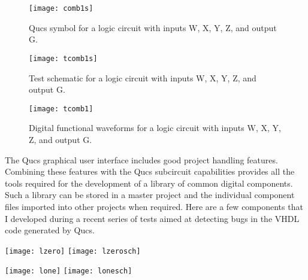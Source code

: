 \begin{figure}
  \centering
  \texttt{[image: comb1s]}
  \caption{Qucs symbol for a logic circuit with inputs W, X, Y, Z, and output G.}
  \label{fig:comb1s}
\end{figure}
\FloatBarrier

\begin{figure}
  \centering
  \texttt{[image: tcomb1s]}
  \caption{Test schematic for a logic circuit with inputs W, X, Y, Z, and output G.}
  \label{fig:tcomb1s}
\end{figure}
\FloatBarrier

\begin{figure}
  \centering
  \texttt{[image: tcomb1]}
  \caption{Digital functional waveforms for a logic circuit with inputs W, X, Y, Z, and output G.}
  \label{fig:tcomb1}
\end{figure}
\FloatBarrier


The Qucs graphical user interface includes good project handling
features.  Combining these features with the Qucs subcircuit
capabilities provides all the tools required for the development of a
library of common digital components.  Such a library can be stored in
a master project and the individual component files imported into
other projects when required.  Here are a few components that I
developed during a recent series of tests aimed at detecting bugs in
the VHDL code generated by Qucs.


\begin{flushleft}
  \texttt{[image: lzero]} \hspace{10mm} \texttt{[image: lzerosch]}

\end{flushleft}


\begin{flushleft}
  \texttt{[image: lone]} \hspace{10mm} \texttt{[image: lonesch]}
\end{flushleft}

